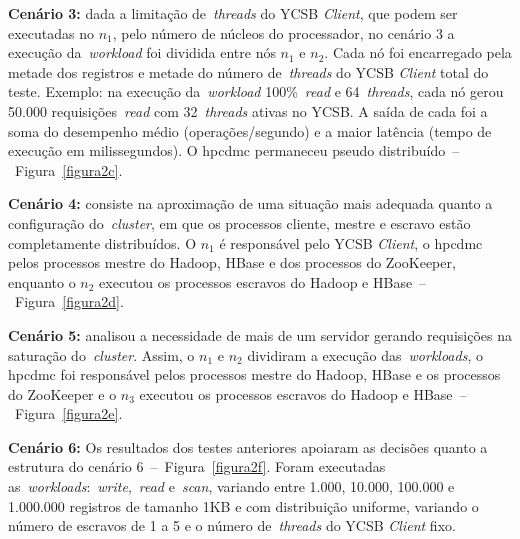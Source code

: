 \documentclass[12pt]{article}
\begin{document}
\textbf{Cenário 3:} dada a limitação de~\emph{threads} do YCSB \emph{Client}, que podem ser executadas no $n_1$, pelo número de núcleos do processador, no cenário 3 a execução da~\emph{workload} foi dividida entre nós $n_1$ e $n_2$. 
Cada nó foi encarregado pela metade dos registros e metade do número de~\emph{threads} do YCSB \emph{Client} total do teste. 
Exemplo: na execução da~\emph{workload} 100\%~\emph{read} e 64~\emph{threads}, cada nó gerou 50.000 requisições~\emph{read} com 32~\emph{threads} ativas no YCSB. 
A saída de cada foi a soma do desempenho médio (operações/segundo) e a maior latência (tempo de execução em milissegundos). 
O hpcdmc permaneceu pseudo distribuído~--~Figura~\ref{figura2c}.

\textbf{Cenário 4:} consiste na aproximação de uma situação mais adequada quanto a configuração do~\emph{cluster}, em que os processos cliente, mestre e escravo estão completamente distribuídos. 
O $n_1$ é responsável pelo YCSB \textit{Client}, o hpcdmc pelos processos mestre do Hadoop, HBase e dos processos do ZooKeeper, enquanto o $n_2$ executou os processos escravos do Hadoop e HBase~--~Figura~\ref{figura2d}.

\textbf{Cenário 5:} analisou a necessidade de mais de um servidor gerando requisições na saturação do~\emph{cluster}. 
Assim, o $n_1$ e $n_2$ dividiram a execução das~\emph{workloads}, o hpcdmc foi responsável pelos processos mestre do Hadoop, HBase e os processos do ZooKeeper e o $n_3$ executou os processos escravos do Hadoop e HBase~--~Figura~\ref{figura2e}.

\textbf{Cenário 6:} Os resultados dos testes anteriores apoiaram as decisões quanto a estrutura do cenário 6~--~Figura~\ref{figura2f}. Foram executadas as~\emph{workloads}:~\emph{write},~\emph{read} e~\emph{scan}, variando entre 1.000, 10.000, 100.000 e 1.000.000 registros de tamanho 1KB e com distribuição uniforme, variando o número de escravos de 1 a 5 e o número de~\emph{threads} do YCSB \textit{Client} fixo.
\end{document}

